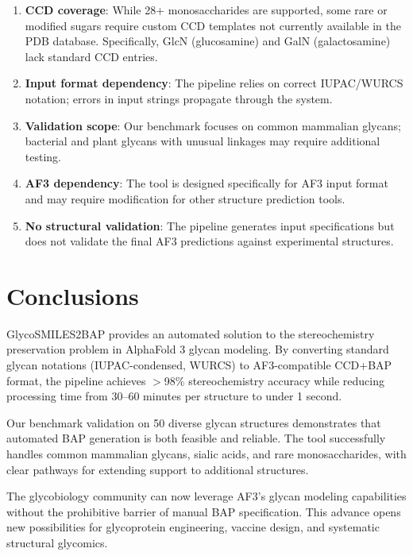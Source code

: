 \documentclass[11pt,a4paper]{article}
\begin{document}
\begin{enumerate}
\item \textbf{CCD coverage}: While 28+ monosaccharides are supported, some rare or modified sugars require custom CCD templates not currently available in the PDB database. Specifically, GlcN (glucosamine) and GalN (galactosamine) lack standard CCD entries.

\item \textbf{Input format dependency}: The pipeline relies on correct IUPAC/WURCS notation; errors in input strings propagate through the system.

\item \textbf{Validation scope}: Our benchmark focuses on common mammalian glycans; bacterial and plant glycans with unusual linkages may require additional testing.

\item \textbf{AF3 dependency}: The tool is designed specifically for AF3 input format and may require modification for other structure prediction tools.

\item \textbf{No structural validation}: The pipeline generates input specifications but does not validate the final AF3 predictions against experimental structures.
\end{enumerate}

\section{Conclusions}

GlycoSMILES2BAP provides an automated solution to the stereochemistry preservation problem in AlphaFold 3 glycan modeling. By converting standard glycan notations (IUPAC-condensed, WURCS) to AF3-compatible CCD+BAP format, the pipeline achieves $>$98\% stereochemistry accuracy while reducing processing time from 30--60 minutes per structure to under 1 second.

Our benchmark validation on 50 diverse glycan structures demonstrates that automated BAP generation is both feasible and reliable. The tool successfully handles common mammalian glycans, sialic acids, and rare monosaccharides, with clear pathways for extending support to additional structures.

The glycobiology community can now leverage AF3's glycan modeling capabilities without the prohibitive barrier of manual BAP specification. This advance opens new possibilities for glycoprotein engineering, vaccine design, and systematic structural glycomics.
\end{document}
